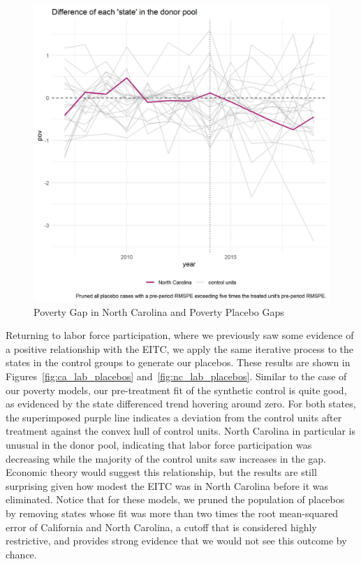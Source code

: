 \documentclass{article}
\begin{document}
\begin{figure}[H]
    \caption{Poverty Gap in North Carolina and Poverty Placebo Gaps}
    \begin{center}
        \includegraphics[width=.85\textwidth]{nc_pov_placebos}
    \end{center}
    \label{fig:nc_pov_placebos}{}
\end{figure}

Returning to labor force participation, where we previously saw some evidence of a positive relationship with the EITC, we apply the same iterative process to the states in the control groups to generate our placebos. These results are shown in Figures~\ref{fig:ca_lab_placebos} and~\ref{fig:nc_lab_placebos}. Similar to the case of our poverty models, our pre-treatment fit of the synthetic control is quite good, as evidenced by the state differenced trend hovering around zero. For both states, the superimposed purple line indicates a deviation from the control units after treatment against the convex hull of control units. North Carolina in particular is unusual in the donor pool, indicating that labor force participation was decreasing while the majority of the control units saw increases in the gap. Economic theory would suggest this relationship, but the results are still surprising given how modest the EITC was in North Carolina before it was eliminated. Notice that for these models, we pruned the population of placebos by removing states whose fit was more than two times the root mean-squared error of California and North Carolina, a cutoff that is considered highly restrictive, and provides strong evidence that we would not see this outcome by chance.
\end{document}
